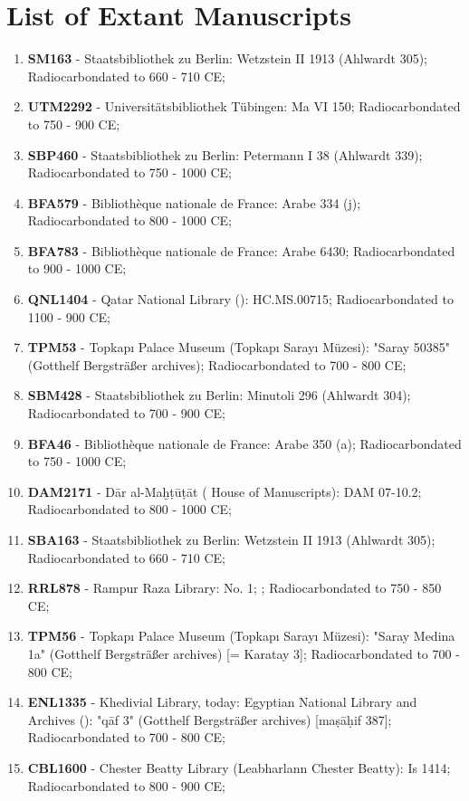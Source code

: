 \chapter*{List of Extant Manuscripts}
\label{ch:list_manuscripts}
\begin{enumerate}
    \item \textbf{SM163} - Staatsbibliothek zu Berlin: Wetzstein II 1913 (Ahlwardt 305); Radiocarbondated to 660 - 710 CE;
    \item \textbf{UTM2292} - Universitätsbibliothek Tübingen: Ma VI 150; Radiocarbondated to 750 - 900 CE;
    \item \textbf{SBP460} - Staatsbibliothek zu Berlin: Petermann I 38 (Ahlwardt 339); Radiocarbondated to 750 - 1000 CE;
    \item \textbf{BFA579} - Bibliothèque nationale de France: Arabe 334 (j); Radiocarbondated to 800 - 1000 CE;
    \item \textbf{BFA783} - Bibliothèque nationale de France: Arabe 6430; Radiocarbondated to 900 - 1000 CE;
    \item \textbf{QNL1404} - Qatar National Library (): HC.MS.00715; Radiocarbondated to 1100 - 900 CE;
    \item \textbf{TPM53} - Topkapı Palace Museum (Topkapı Sarayı Müzesi): "Saray 50385" (Gotthelf Bergsträßer archives); Radiocarbondated to 700 - 800 CE;
    \item \textbf{SBM428} - Staatsbibliothek zu Berlin: Minutoli 296 (Ahlwardt 304); Radiocarbondated to 700 - 900 CE;
    \item \textbf{BFA46} - Bibliothèque nationale de France: Arabe 350 (a); Radiocarbondated to 750 - 1000 CE;
    \item \textbf{DAM2171} - Dār al-Maḫṭūṭāt ( House of Manuscripts): DAM 07-10.2; Radiocarbondated to 800 - 1000 CE;
    \item \textbf{SBA163} - Staatsbibliothek zu Berlin: Wetzstein II 1913 (Ahlwardt 305); Radiocarbondated to 660 - 710 CE;
    \item \textbf{RRL878} - Rampur Raza Library: No. 1; ; Radiocarbondated to 750 - 850 CE;
    \item \textbf{TPM56} - Topkapı Palace Museum (Topkapı Sarayı Müzesi): "Saray Medina 1a" (Gotthelf Bergsträßer archives) [= Karatay 3]; Radiocarbondated to 700 - 800 CE;
    \item \textbf{ENL1335} - Khedivial Library, today: Egyptian National Library and Archives (): "qāf 3" (Gotthelf Bergsträßer archives) [maṣāḥif 387]; Radiocarbondated to 700 - 800 CE;
    \item \textbf{CBL1600} - Chester Beatty Library (Leabharlann Chester Beatty): Is 1414; Radiocarbondated to 800 - 900 CE;
\end{enumerate}